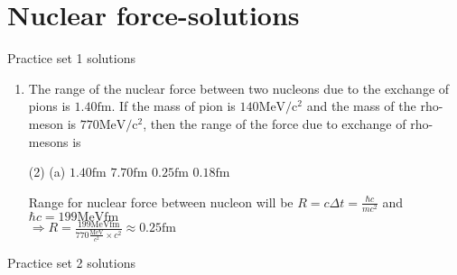 \chapter{Nuclear force-solutions}
\begin{abox}
	Practice set 1 solutions
	\end{abox}
\begin{enumerate}
	\item The range of the nuclear force between two nucleons due to the exchange of pions is $1.40 \mathrm{fm}$. If the mass of pion is $140 \mathrm{MeV} / \mathrm{c}^{2}$ and the mass of the rho-meson is $770 \mathrm{MeV} / \mathrm{c}^{2}$, then the range of the force due to exchange of rho-mesons is
	{}
	\begin{tasks}(2)
		\task[\textbf{A.}](a) $1.40 \mathrm{fm}$
		\task[\textbf{B.}]$7.70 \mathrm{fm}$
		\task[\textbf{C.}]$0.25 \mathrm{fm}$
		\task[\textbf{D.}]$0.18 \mathrm{fm}$
	\end{tasks}
\begin{answer}
	Range for nuclear force between nucleon will be $R=c \Delta t=\frac{\hbar c}{m c^{2}}$ and $\hbar c=199 \mathrm{MeVfm}$\\
	$\Rightarrow R=\frac{199 \mathrm{MeVfm}}{770 \frac{\mathrm{MeV}}{c^{2}} \times c^{2}} \approx 0.25 \mathrm{fm}$
\end{answer}
\end{enumerate}
\newpage
\begin{abox}
	Practice set 2 solutions
	\end{abox}
